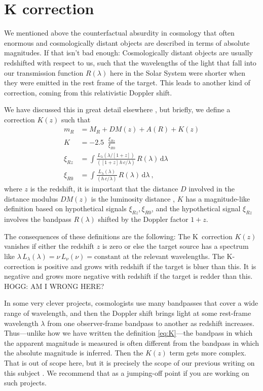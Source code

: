 \documentclass[10pt]{article}
\newcommand{\dd}{\mathrm{d}}
\DeclareMathOperator{\logten}{log_{10}}
\begin{document}
\section{K correction}\label{sec:kcorrect}

We mentioned above the counterfactual absurdity in cosmology that often enormous and cosmologically distant objects are described in terms of absolute magnitudes.
If that isn't bad enough:
Cosmologically distant objects are usually redshifted with respect to us, such that the wavelengths of the light that fall into our transmission function $R(\lambda)$ here in the Solar System were shorter when they were emitted in the rest frame of the target.
This leads to another kind of correction, coming from this relativistic Doppler shift.

We have discussed this in great detail elsewhere \cite{kcorrect}, but briefly, we define a correction $K(z)$ such that
\begin{align}
    m_R &= M_R + DM(z) + A(R) + K(z)\label{eq:K}\\
    K &= -2.5\logten\frac{\xi_{Rz}}{\xi_{R0}}\\
    \xi_{Rz} &= \int\frac{L_\lambda(\lambda/[1+z])}{([1+z]\,h\,c/\lambda)}\,R(\lambda)\,\dd\lambda\\
    \xi_{R0} &= \int\frac{L_\lambda(\lambda)}{(h\,c/\lambda)}\,R(\lambda)\,\dd\lambda ~,
\end{align}
where $z$ is the redshift,
it is important that the distance $D$ involved in the distance modulus $DM(z)$ is the luminosity distance \cite{distances},
$K$ has a magnitude-like definition based on hypothetical signals $\xi_{Rz}, \xi_{R0}$,
and the hypothetical signal $\xi_{Rz}$ involves the bandpass $R(\lambda)$ shifted by the Doppler factor $1+z$.

The consequences of these definitions are the following:
The K~correction $K(z)$ vanishes if either the redshift $z$ is zero or else the target source has a spectrum like $\lambda\,L_\lambda(\lambda)=\nu\,L_\nu(\nu)=\text{constant}$ at the relevant wavelengths.
The K-correction is positive and grows with redshift if the target is bluer than this.
It is negative and grows more negative with redshift if the target is redder than this.
HOGG: AM I WRONG HERE?

In some very clever projects, cosmologists use many bandpasses that cover a wide range of wavelength, and then the Doppler shift brings light at some rest-frame wavelength $\lambda$ from one observer-frame bandpass to another as redshift increases.
Thus---unlike how we have written the definition \eqref{eq:K}---the bandpass in which the apparent magnitude is measured is often different from the bandpass in which the absolute magnitude is inferred. Then the $K(z)$ term gets more complex.
That is out of scope here, but it is precisely the scope of our previous writing on this subject \cite{kcorrect}.
We recommend that as a jumping-off point if you are working on such projects.
\end{document}
